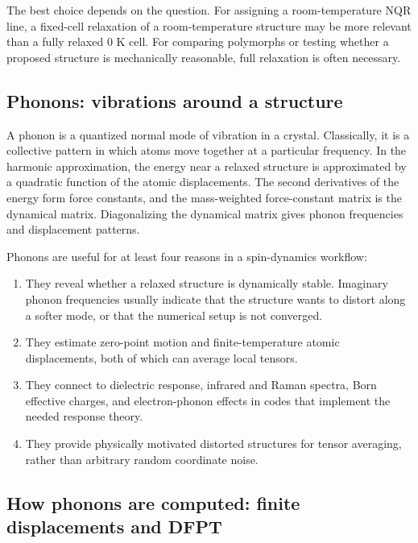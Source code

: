 \documentclass[11pt]{article}
\begin{document}
The best choice depends on the question.  For assigning a room-temperature NQR line, a fixed-cell relaxation of a room-temperature structure may be more relevant than a fully relaxed 0 K cell.  For comparing polymorphs or testing whether a proposed structure is mechanically reasonable, full relaxation is often necessary.

\subsection{Phonons: vibrations around a structure}

A phonon is a quantized normal mode of vibration in a crystal.  Classically, it is a collective pattern in which atoms move together at a particular frequency.  In the harmonic approximation, the energy near a relaxed structure is approximated by a quadratic function of the atomic displacements.  The second derivatives of the energy form force constants, and the mass-weighted force-constant matrix is the dynamical matrix.  Diagonalizing the dynamical matrix gives phonon frequencies and displacement patterns.

Phonons are useful for at least four reasons in a spin-dynamics workflow:
\begin{enumerate}
\item They reveal whether a relaxed structure is dynamically stable.  Imaginary phonon frequencies usually indicate that the structure wants to distort along a softer mode, or that the numerical setup is not converged.
\item They estimate zero-point motion and finite-temperature atomic displacements, both of which can average local tensors.
\item They connect to dielectric response, infrared and Raman spectra, Born effective charges, and electron-phonon effects in codes that implement the needed response theory.
\item They provide physically motivated distorted structures for tensor averaging, rather than arbitrary random coordinate noise.
\end{enumerate}

\subsection{How phonons are computed: finite displacements and DFPT}
\end{document}
